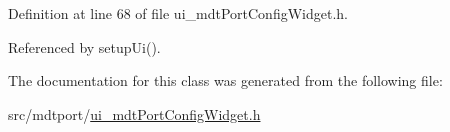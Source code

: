 Definition at line 68 of file ui\-\_\-mdt\-Port\-Config\-Widget.\-h.



Referenced by setup\-Ui().



The documentation for this class was generated from the following file\-:\begin{DoxyCompactItemize}
\item 
src/mdtport/\hyperlink{ui__mdt_port_config_widget_8h}{ui\-\_\-mdt\-Port\-Config\-Widget.\-h}\end{DoxyCompactItemize}
